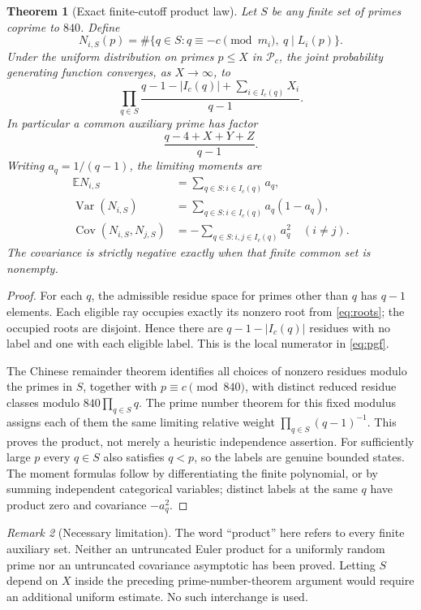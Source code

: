 \documentclass[11pt]{article}
\newtheorem{theorem}{Theorem}[section]
\theoremstyle{remark}\newtheorem{remark}[theorem]{Remark}
\newcommand{\Pcal}{\mathcal P}
\newcommand{\Cov}{\operatorname{Cov}}
\newcommand{\Var}{\operatorname{Var}}
\begin{document}
\begin{theorem}[Exact finite-cutoff product law]\label{thm:pgf}
Let $S$ be any finite set of primes coprime to $840$. Define
\[
 N_{i,S}(p)=\#\{q\in S:q\equiv-c\pmod{m_i},\ q\mid L_i(p)\}.
\]
Under the uniform distribution on primes $p\le X$ in $\Pcal_c$, the joint probability generating function converges, as $X\to\infty$, to
\begin{equation}\label{eq:pgf}
 \prod_{q\in S}
 \frac{q-1-|I_c(q)|+\sum_{i\in I_c(q)}X_i}{q-1}.
\end{equation}
In particular a common auxiliary prime has factor
\begin{equation}\label{eq:commonfactor}
 \frac{q-4+X+Y+Z}{q-1}.
\end{equation}
Writing $a_q=1/(q-1)$, the limiting moments are
\begin{align}
 \mathbb EN_{i,S}&=\sum_{q\in S:i\in I_c(q)}a_q,\\
 \Var(N_{i,S})&=\sum_{q\in S:i\in I_c(q)}a_q(1-a_q),\\
 \Cov(N_{i,S},N_{j,S})&=-\sum_{q\in S:i,j\in I_c(q)}a_q^2\quad(i\ne j).\label{eq:cov}
\end{align}
The covariance is strictly negative exactly when that finite common set is nonempty.
\end{theorem}
\begin{proof}
For each $q$, the admissible residue space for primes other than $q$ has $q-1$ elements. Each eligible ray occupies exactly its nonzero root from \eqref{eq:roots}; the occupied roots are disjoint. Hence there are $q-1-|I_c(q)|$ residues with no label and one with each eligible label. This is the local numerator in \eqref{eq:pgf}.

The Chinese remainder theorem identifies all choices of nonzero residues modulo the primes in $S$, together with $p\equiv c\pmod{840}$, with distinct reduced residue classes modulo $840\prod_{q\in S}q$. The prime number theorem for this fixed modulus assigns each of them the same limiting relative weight $\prod_{q\in S}(q-1)^{-1}$. This proves the product, not merely a heuristic independence assertion. For sufficiently large $p$ every $q\in S$ also satisfies $q<p$, so the labels are genuine bounded states. The moment formulas follow by differentiating the finite polynomial, or by summing independent categorical variables; distinct labels at the same $q$ have product zero and covariance $-a_q^2$.
\end{proof}

\begin{remark}[Necessary limitation]
The word ``product'' here refers to every finite auxiliary set. Neither an untruncated Euler product for a uniformly random prime nor an untruncated covariance asymptotic has been proved. Letting $S$ depend on $X$ inside the preceding prime-number-theorem argument would require an additional uniform estimate. No such interchange is used.
\end{remark}
\end{document}
